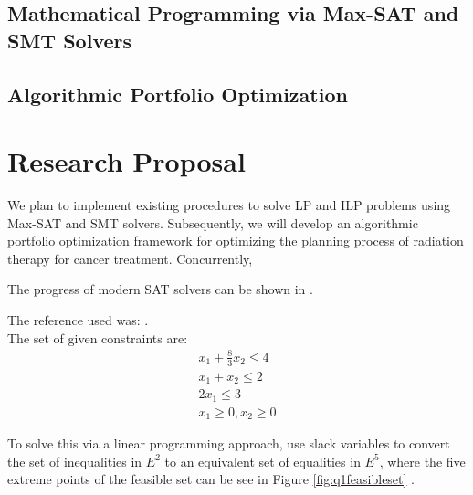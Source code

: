 \documentclass[letter,12pt]{article}
\begin{document}
\subsection{Mathematical Programming via Max-SAT and SMT Solvers}
\label{ssec:mathematicalprogrammingviamaxsatandsmt}

\subsection{Algorithmic Portfolio Optimization}
\label{ssec:algorithmicportfoliooptimization}




\section{Research Proposal}
\label{sec:summaryofliteraturesurvey}

We plan to implement existing procedures to solve LP and ILP problems using Max-SAT and SMT solvers. Subsequently, we will develop an algorithmic portfolio optimization framework for optimizing the planning process of radiation therapy for cancer treatment. Concurrently, 



The progress of modern SAT solvers can be shown in \cite[Fig. 1.2, pp. 5, Chapter 1]{Samulowitz2008} \cite[slide 7]{Sabharwal2011} \cite[slide 7]{Sabharwal2007}.

\cite[slide 9]{Ganesh2013}






The reference used was: \cite[\S2.5, pages 25--27]{Luenberger2008}. \\

The set of given constraints are:
\begin{eqnarray*}
x_{1} + \frac{8}{3}x_{2} \leq 4 \\
x_{1} + x_{2} \leq 2 \\
2x_{1} \leq 3 \\
x_{1} \geq 0, x_{2} \geq 0
\end{eqnarray*}



To solve this via a linear programming approach, use slack variables to convert the set of inequalities in $E^{2}$ to an equivalent set of equalities in $E^{5}$, where the five extreme points of the feasible set can be see in Figure \ref{fig:q1feasibleset} \cite[\S2.1, pages 12]{Luenberger2008}. \\
\end{document}
